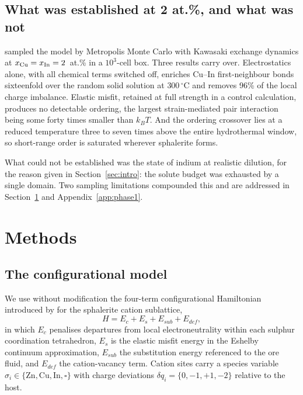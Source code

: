 \documentclass[11pt,a4paper]{article}
\begin{document}
\subsection{What was established at 2 at.\%, and what was not}

\citet{yu2026} sampled the model by Metropolis Monte Carlo with Kawasaki
exchange dynamics at $x_{\rm Cu} = x_{\rm In} = 2$~at.\% in a $10^3$-cell box.
Three results carry over. Electrostatics alone, with all chemical terms switched
off, enriches Cu--In first-neighbour bonds sixteenfold over the random solid
solution at $300\,^\circ$C and removes 96\% of the local charge imbalance.
Elastic misfit, retained at full strength in a control calculation, produces no
detectable ordering, the largest strain-mediated pair interaction being some
forty times smaller than $k_BT$. And the ordering crossover lies at a reduced
temperature three to seven times above the entire hydrothermal window, so
short-range order is saturated wherever sphalerite forms.

What could not be established was the state of indium at realistic dilution, for
the reason given in Section~\ref{sec:intro}: the solute budget was exhausted by
a single domain. Two sampling limitations compounded this and are addressed in
Section~\ref{sec:methods} and Appendix~\ref{app:phase1}.

\section{Methods}
\label{sec:methods}

\subsection{The configurational model}
\label{sec:model}

We use without modification the four-term configurational Hamiltonian introduced
by \citet{yu2026} for the sphalerite cation sublattice,
\begin{equation}
H = E_c + E_s + E_{sub} + E_{def},
\label{eq:H}
\end{equation}
in which $E_c$ penalises departures from local electroneutrality within each
sulphur coordination tetrahedron, $E_s$ is the elastic misfit energy in the
Eshelby continuum approximation, $E_{sub}$ the substitution energy referenced to
the ore fluid, and $E_{def}$ the cation-vacancy term. Cation sites carry a
species variable $\sigma_i \in \{\mathrm{Zn},\mathrm{Cu},\mathrm{In},\square\}$
with charge deviations $\delta q_i = \{0,-1,+1,-2\}$ relative to the host.
\end{document}
